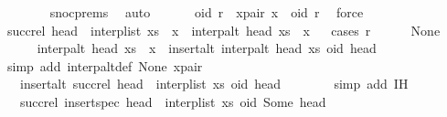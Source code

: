 \begin{isabellebody}
\ \ \ \ \ \ \isamarkupfalse%
\ snoc{\isachardot}prems{\isacharparenleft}{}{\isacharparenright}\ \isamarkupfalse%
\ auto\isanewline
\ \ \isamarkupfalse%
\isanewline
\ \ \isamarkupfalse%
\ oid\ r\ \ x{\isacharunderscore}pair{\isacharcolon}\ {\isachardoublequoteopen}x\ {\isacharequal}\ {\isacharparenleft}oid{\isacharcomma}\ r{\isacharparenright}{\isachardoublequoteclose}\ \isamarkupfalse%
\ force\isanewline
\ \ \isamarkupfalse%
\ \isamarkupfalse%
\ {\isachardoublequoteopen}succ{\isacharunderscore}rel\ {\isacharparenleft}head\ {\isacharhash}\ interp{\isacharunderscore}list\ {\isacharparenleft}xs\ {\isacharat}\ {\isacharbrackleft}x{\isacharbrackright}{\isacharparenright}{\isacharparenright}\ {\isacharequal}\ interp{\isacharunderscore}alt\ head\ {\isacharparenleft}xs\ {\isacharat}\ {\isacharbrackleft}x{\isacharbrackright}{\isacharparenright}{\isachardoublequoteclose}\isanewline
\ \ \isamarkupfalse%
{\isacharparenleft}cases\ r{\isacharparenright}\isanewline
\ \ \ \ \isamarkupfalse%
\ None\isanewline
\ \ \ \ \isamarkupfalse%
\ {\isachardoublequoteopen}interp{\isacharunderscore}alt\ head\ {\isacharparenleft}xs\ {\isacharat}\ {\isacharbrackleft}x{\isacharbrackright}{\isacharparenright}\ {\isacharequal}\ insert{\isacharunderscore}alt\ {\isacharparenleft}interp{\isacharunderscore}alt\ head\ xs{\isacharparenright}\ {\isacharparenleft}oid{\isacharcomma}\ head{\isacharparenright}{\isachardoublequoteclose}\isanewline
\ \ \ \ \ \ \isamarkupfalse%
\ {\isacharparenleft}simp\ add{\isacharcolon}\ interp{\isacharunderscore}alt{\isacharunderscore}def\ None\ x{\isacharunderscore}pair{\isacharparenright}\isanewline
\ \ \ \ \isamarkupfalse%
\ \isamarkupfalse%
\ {\isachardoublequoteopen}{\isachardot}{\isachardot}{\isachardot}\ {\isacharequal}\ insert{\isacharunderscore}alt\ {\isacharparenleft}succ{\isacharunderscore}rel\ {\isacharparenleft}head\ {\isacharhash}\ interp{\isacharunderscore}list\ xs{\isacharparenright}{\isacharparenright}\ {\isacharparenleft}oid{\isacharcomma}\ head{\isacharparenright}{\isachardoublequoteclose}\isanewline
\ \ \ \ \ \ \isamarkupfalse%
\ {\isacharparenleft}simp\ add{\isacharcolon}\ IH{\isacharparenright}\isanewline
\ \ \ \ \isamarkupfalse%
\ \isamarkupfalse%
\ {\isachardoublequoteopen}{\isachardot}{\isachardot}{\isachardot}\ {\isacharequal}\ succ{\isacharunderscore}rel\ {\isacharparenleft}insert{\isacharunderscore}spec\ {\isacharparenleft}head\ {\isacharhash}\ interp{\isacharunderscore}list\ xs{\isacharparenright}\ {\isacharparenleft}oid{\isacharcomma}\ Some\ head{\isacharparenright}{\isacharparenright}{\isachardoublequoteclose}\isanewline

\end{isabellebody}
